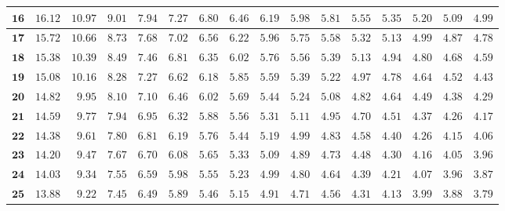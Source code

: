 \begin{customTableWrapper}{1.4}
\begin{longtable}{|r|r|r|r|r|r|r|r|r|r|r|r|r|r|r|r|}
    ${\mathbf{16}}$  & ${16.12}$   & ${10.97}$   & ${9.01}$   & ${7.94}$   & ${7.27}$   & ${6.80}$   & ${6.46}$   & ${6.19}$   & ${5.98}$   & ${5.81}$   & ${5.55}$   & ${5.35}$   & ${5.20}$   & ${5.09}$   & ${4.99}$   \\ \hline 
    ${\mathbf{17}}$  & ${15.72}$   & ${10.66}$   & ${8.73}$   & ${7.68}$   & ${7.02}$   & ${6.56}$   & ${6.22}$   & ${5.96}$   & ${5.75}$   & ${5.58}$   & ${5.32}$   & ${5.13}$   & ${4.99}$   & ${4.87}$   & ${4.78}$   \\ \hline 
    ${\mathbf{18}}$  & ${15.38}$   & ${10.39}$   & ${8.49}$   & ${7.46}$   & ${6.81}$   & ${6.35}$   & ${6.02}$   & ${5.76}$   & ${5.56}$   & ${5.39}$   & ${5.13}$   & ${4.94}$   & ${4.80}$   & ${4.68}$   & ${4.59}$   \\ \hline 
    ${\mathbf{19}}$  & ${15.08}$   & ${10.16}$   & ${8.28}$   & ${7.27}$   & ${6.62}$   & ${6.18}$   & ${5.85}$   & ${5.59}$   & ${5.39}$   & ${5.22}$   & ${4.97}$   & ${4.78}$   & ${4.64}$   & ${4.52}$   & ${4.43}$   \\ \hline 
    ${\mathbf{20}}$  & ${14.82}$   & ${9.95}$   & ${8.10}$   & ${7.10}$   & ${6.46}$   & ${6.02}$   & ${5.69}$   & ${5.44}$   & ${5.24}$   & ${5.08}$   & ${4.82}$   & ${4.64}$   & ${4.49}$   & ${4.38}$   & ${4.29}$   \\ \hline 
    ${\mathbf{21}}$  & ${14.59}$   & ${9.77}$   & ${7.94}$   & ${6.95}$   & ${6.32}$   & ${5.88}$   & ${5.56}$   & ${5.31}$   & ${5.11}$   & ${4.95}$   & ${4.70}$   & ${4.51}$   & ${4.37}$   & ${4.26}$   & ${4.17}$   \\ \hline 
    ${\mathbf{22}}$  & ${14.38}$   & ${9.61}$   & ${7.80}$   & ${6.81}$   & ${6.19}$   & ${5.76}$   & ${5.44}$   & ${5.19}$   & ${4.99}$   & ${4.83}$   & ${4.58}$   & ${4.40}$   & ${4.26}$   & ${4.15}$   & ${4.06}$   \\ \hline 
    ${\mathbf{23}}$  & ${14.20}$   & ${9.47}$   & ${7.67}$   & ${6.70}$   & ${6.08}$   & ${5.65}$   & ${5.33}$   & ${5.09}$   & ${4.89}$   & ${4.73}$   & ${4.48}$   & ${4.30}$   & ${4.16}$   & ${4.05}$   & ${3.96}$   \\ \hline 
    ${\mathbf{24}}$  & ${14.03}$   & ${9.34}$   & ${7.55}$   & ${6.59}$   & ${5.98}$   & ${5.55}$   & ${5.23}$   & ${4.99}$   & ${4.80}$   & ${4.64}$   & ${4.39}$   & ${4.21}$   & ${4.07}$   & ${3.96}$   & ${3.87}$   \\ \hline 
    ${\mathbf{25}}$  & ${13.88}$   & ${9.22}$   & ${7.45}$   & ${6.49}$   & ${5.89}$   & ${5.46}$   & ${5.15}$   & ${4.91}$   & ${4.71}$   & ${4.56}$   & ${4.31}$   & ${4.13}$   & ${3.99}$   & ${3.88}$   & ${3.79}$   \\ \hline 

\end{longtable}
\end{customTableWrapper}
